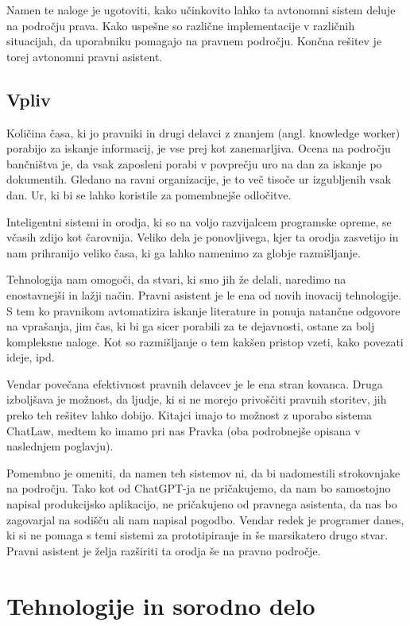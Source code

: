 \documentclass[a4paper,12pt,openright]{book}
\begin{document}
Namen te naloge je ugotoviti, kako učinkovito lahko ta avtonomni sistem deluje na področju prava. Kako uspešne so različne implementacije v različnih situacijah, da uporabniku pomagajo na pravnem področju. Končna rešitev je torej avtonomni pravni asistent.

\section{Vpliv}

Količina časa, ki jo pravniki in drugi delavci z znanjem (angl. knowledge worker) porabijo za iskanje informacij, je vse prej kot zanemarljiva. Ocena na področju bančništva je, da vsak zaposleni porabi v povprečju uro na dan za iskanje po dokumentih. Gledano na ravni organizacije, je to več tisoče ur izgubljenih vsak dan. Ur, ki bi se lahko koristile za pomembnejše odločitve.

Inteligentni sistemi in orodja, ki so na voljo razvijalcem programske opreme, se včasih zdijo kot čarovnija. Veliko dela je ponovljivega, kjer ta orodja zasvetijo in nam prihranijo veliko časa, ki ga lahko namenimo za globje razmišljanje.

Tehnologija nam omogoči, da stvari, ki smo jih že delali, naredimo na enostavnejši in lažji način. Pravni asistent je le ena od novih inovacij tehnologije. S tem ko pravnikom avtomatizira iskanje literature in ponuja natančne odgovore na vprašanja, jim čas, ki bi ga sicer porabili za te dejavnosti, ostane za bolj kompleksne naloge. Kot so razmišljanje o tem kakšen pristop vzeti, kako povezati ideje, ipd.

Vendar povečana efektivnost pravnih delavcev je le ena stran kovanca. Druga izboljšava je možnost, da ljudje, ki si ne morejo privoščiti pravnih storitev, jih preko teh rešitev lahko dobijo. Kitajci imajo to možnost z uporabo sistema ChatLaw, medtem ko imamo pri nas Pravka (oba podrobnejše opisana v naslednjem poglavju).

Pomembno je omeniti, da namen teh sistemov ni, da bi nadomestili strokovnjake na področju. Tako kot od ChatGPT-ja ne pričakujemo, da nam bo samostojno napisal produkcijsko aplikacijo, ne pričakujeno od pravnega asistenta, da nas bo zagovarjal na sodišču ali nam napisal pogodbo. Vendar redek je programer danes, ki si ne pomaga s temi sistemi za prototipiranje in še marsikatero drugo stvar. Pravni asistent je želja razširiti ta orodja še na pravno področje.

\chapter{Tehnologije in sorodno delo}
\label{ch1}
\end{document}

